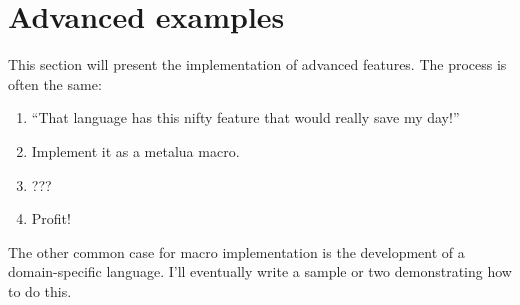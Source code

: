 \section{Advanced examples}
This section will present the implementation of advanced features. The
process is often the same:
\begin{enumerate}
\item ``That language has this nifty feature that would really save my
  day!''
\item Implement it as a metalua macro.
\item ???
\item Profit!
\end{enumerate}

The other common case for macro implementation is the development of a
domain-specific language. I'll eventually write a sample or two
demonstrating how to do this.
